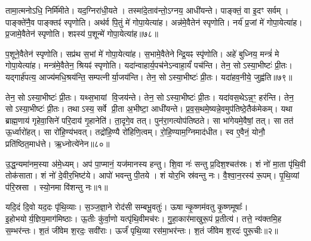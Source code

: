तामा॒त्मनोऽधि॒ निर्मि॑मीते।
यद॒ग्निरा॑धी॒यते।
तस्मा॑दे॒ताव॑न्तो॒\-ऽग्नय॒ आधी॑यन्ते।
पाङ्क्तं॒ वा इ॒दꣳ सर्वम्।
पाङ्क्ते॑नै॒व पाङ्क्तꣴ॑ स्पृणोति।
अथ॑र्व पि॒तुं मे॑ गोपा॒येत्या॑ह।
अन्न॑मे॒वैतेन॑ स्पृणोति।
नर्य॑ प्र॒जां मे॑ गोपा॒येत्या॑ह।
प्र॒जामे॒वैतेन॑ स्पृणोति।
शꣴस्य॑ प॒शून्मे॑ गोपा॒येत्या॑ह॥७८॥

प॒शूने॒वैतेन॑ स्पृणोति।
सप्र॑थ स॒भां मे॑ गोपा॒येत्या॑ह।
स॒भामे॒वैतेनेन्द्रि॒यꣴ स्पृ॑णोति।
अहे॑ बुध्निय॒ मन्त्रं॑ मे गोपा॒येत्या॑ह।
मन्त्र॑मे॒वैतेन॒ श्रियꣴ॑ स्पृणोति।
यदा॑न्वाहार्य॒पच॑ने\-ऽन्वाहा॒र्यं॑ पच॑न्ति।
तेन॒ सो\-ऽस्या॒भीष्टः॑ प्री॒तः।
यद्गार्\mbox{}ह॑पत्य॒ आज्य॑मधि॒श्रय॑न्ति॒ सम्पत्नीर्या॒जय॑न्ति।
तेन॒ सो\-ऽस्या॒भीष्टः॑ प्री॒तः।
यदा॑हव॒नीये॒ जुह्व॑ति॥७९॥

तेन॒ सो\-ऽस्या॒भीष्टः॑ प्री॒तः।
यथ्स॒भायां वि॒जय॑न्ते।
तेन॒ सो\-ऽस्या॒भीष्टः॑ प्री॒तः।
यदा॑वस॒थे\-ऽन्न॒ꣳ॒ हर॑न्ति।
तेन॒ सो\-ऽस्या॒भीष्टः॑ प्री॒तः।
तथाऽस्य॒ सर्वे प्री॒ता अ॒भीष्टा॒ आधी॑यन्ते।
प्र॒व॒स॒थमे॒ष्यन्ने॒वमुप॑तिष्ठे॒तैक॑मेकम्।
यथा ब्राह्म॒णाय॑ गृहेवा॒सिने॑ परि॒दाय॑ गृ॒हानेति॑।
ता॒दृगे॒व तत्।
पुन॑रा॒गत्योप॑तिष्ठते।
सा भा॑गेयमे॒वैषां॒ तत्।
सा तत॑ ऊ॒र्ध्वारो॑हत्।
सा रो॑हि॒ण्य॑भवत्।
तद्रो॑हि॒ण्यै रो॑हिणि॒त्वम्।
रो॒हि॒ण्याम॒ग्निमाद॑धीत।
स्व ए॒वैनं॒ योनौ॒ प्रति॑ष्ठित॒माध॑त्ते।
ऋ॒ध्नोत्ये॑नेन॥८०॥\anuvakamend[ए॒षा प॒शून्मे॑ गोपा॒येति॒ प्रवि॑ष्टा प॒शून्मे॑ गोपा॒येत्या॑ह॒ जुह्व॑ति तिष्ठते स॒प्त च॑]





\clearpage
{}
\setcounter{anuvakam}{0}

उ॒द्ध॒न्यमा॑नम॒स्या अ॑मे॒ध्यम्।
अप॑ पा॒प्मानं॒ यज॑मानस्य हन्तु।
शि॒वा नः॑ सन्तु प्र॒दिश॒श्चत॑स्रः।
शं नो॑ मा॒ता पृ॑थि॒वी तोक॑साता।
शं नो॑ दे॒वीर॒भिष्ट॑ये।
आपो॑ भवन्तु पी॒तये।
शं योर॒भि स्र॑वन्तु नः।
वै॒श्वा॒न॒रस्य॑ रू॒पम्।
पृ॒थि॒व्यां प॑रि॒स्रसा।
स्यो॒नमा वि॑शन्तु नः॥१॥

यदि॒दं दि॒वो यद॒दः पृ॑थि॒व्याः।
स॒ञ्ज॒ज्ञा॒ने रोद॑सी सम्बभू॒वतुः॑।
ऊषान्कृ॒ष्णम॑वतु कृ॒ष्णमूषाः᳚।
इ॒होभयोर्य॒ज्ञिय॒माग॑मिष्ठाः।
ऊ॒तीः कु॑र्वा॒णो यत्पृ॑थि॒वीमच॑रः।
गु॒हा॒कार॑माखुरू॒पं प्र॒तीत्य॑।
तत्ते॒ न्य॑क्तमि॒ह स॒म्भर॑न्तः।
श॒तं जी॑वेम श॒रदः॒ सवी॑राः।
ऊर्जं॑ पृथि॒व्या रस॑मा॒भर॑न्तः।
श॒तं जी॑वेम श॒रदः॑ पुरू॒चीः॥२॥

